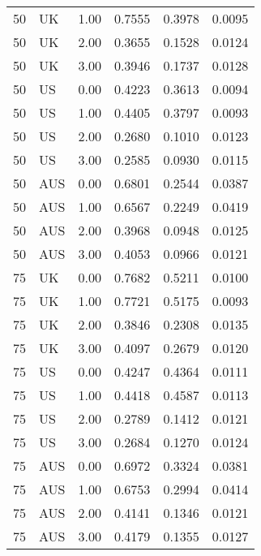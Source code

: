 \begin{table}[ht]
\begin{tabular}{llrlll}
  50 & UK & 1.00 & 0.7555 & 0.3978 & 0.0095 \\ 
  50 & UK & 2.00 & 0.3655 & 0.1528 & 0.0124 \\ 
  50 & UK & 3.00 & 0.3946 & 0.1737 & 0.0128 \\ 
  50 & US & 0.00 & 0.4223 & 0.3613 & 0.0094 \\ 
  50 & US & 1.00 & 0.4405 & 0.3797 & 0.0093 \\ 
  50 & US & 2.00 & 0.2680 & 0.1010 & 0.0123 \\ 
  50 & US & 3.00 & 0.2585 & 0.0930 & 0.0115 \\ 
  50 & AUS & 0.00 & 0.6801 & 0.2544 & 0.0387 \\ 
  50 & AUS & 1.00 & 0.6567 & 0.2249 & 0.0419 \\ 
  50 & AUS & 2.00 & 0.3968 & 0.0948 & 0.0125 \\ 
  50 & AUS & 3.00 & 0.4053 & 0.0966 & 0.0121 \\ 
  75 & UK & 0.00 & 0.7682 & 0.5211 & 0.0100 \\ 
  75 & UK & 1.00 & 0.7721 & 0.5175 & 0.0093 \\ 
  75 & UK & 2.00 & 0.3846 & 0.2308 & 0.0135 \\ 
  75 & UK & 3.00 & 0.4097 & 0.2679 & 0.0120 \\ 
  75 & US & 0.00 & 0.4247 & 0.4364 & 0.0111 \\ 
  75 & US & 1.00 & 0.4418 & 0.4587 & 0.0113 \\ 
  75 & US & 2.00 & 0.2789 & 0.1412 & 0.0121 \\ 
  75 & US & 3.00 & 0.2684 & 0.1270 & 0.0124 \\ 
  75 & AUS & 0.00 & 0.6972 & 0.3324 & 0.0381 \\ 
  75 & AUS & 1.00 & 0.6753 & 0.2994 & 0.0414 \\ 
  75 & AUS & 2.00 & 0.4141 & 0.1346 & 0.0121 \\ 
  75 & AUS & 3.00 & 0.4179 & 0.1355 & 0.0127 \\ 
   \hline
\end{tabular}
\end{table}
